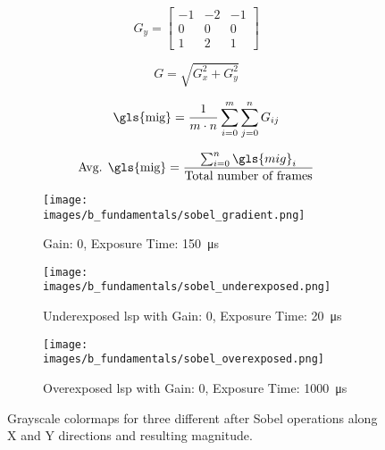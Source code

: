     \begin{equation}
        G_y = 
        \begin{bmatrix}
            -1 & -2 & -1 \\
            0 & 0 & 0 \\
            1 & 2 & 1 
        \end{bmatrix}
        \label{eqn:g_y}
    \end{equation}

    \begin{equation}
        G = \sqrt{G_x^2 + G_y^2}
        \label{eqn:mag_eqn}
    \end{equation}

    \begin{equation}
        \text{\gls{mig}} = \frac{1}{m \cdot n} \sum_{i=0}^{m} \sum_{j=0}^{n} G_{ij}
        \label{eqn:mig}
    \end{equation}

    \begin{equation}
        \text{Avg. \gls{mig}} = \frac{\sum_{i=0}^{n} \gls{mig}_i}{\text{Total number of frames}}
        \label{eqn:avg_mig}
    \end{equation}

    \begin{figure}[h]
        \centering
        \begin{subfigure}[b]{0.95\textwidth}
            \centering
            \texttt{[image: images/b\_fundamentals/sobel\_gradient.png]}
            \caption{Gain: 0, Exposure Time: \SI{150}{\micro\second}}
            \label{fig:sobel_gradient.png}
        \end{subfigure}
        \begin{subfigure}[b]{0.95\textwidth}
            \centering
            \texttt{[image: images/b\_fundamentals/sobel\_underexposed.png]}
            \caption{Underexposed \gls{lsp} with Gain: 0, Exposure Time: \SI{20}{\micro\second}}
            \label{fig:sobel_underexposed.png}
        \end{subfigure}
        \begin{subfigure}[b]{0.95\textwidth}
            \centering
            \texttt{[image: images/b\_fundamentals/sobel\_overexposed.png]}
            \caption{Overexposed \gls{lsp} with Gain: 0, Exposure Time: \SI{1000}{\micro\second}}
            \label{fig:sobel_overexposed.png}
        \end{subfigure}
        \caption{Grayscale colormaps for three different  after Sobel operations along X and Y directions and resulting magnitude.}
        \label{fig:sobel.png}
    \end{figure} 